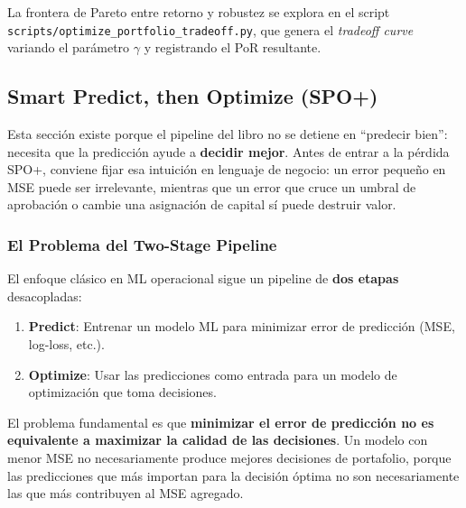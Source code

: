 \documentclass[
  spanish,
  11pt,
  letterpaper,
]{scrbook}
\providecommand{\tightlist}{%
  \setlength{\itemsep}{0pt}\setlength{\parskip}{0pt}}
\theoremstyle{plain}
\theoremstyle{remark}
\begin{document}
La frontera de Pareto entre retorno y robustez se explora en el script
\texttt{scripts/optimize\_portfolio\_tradeoff.py}, que genera el
\emph{tradeoff curve} variando el parámetro \(\gamma\) y registrando el
PoR resultante.

\subsection{Smart Predict, then Optimize (SPO+)}\label{sec-spo-plus}

Esta sección existe porque el pipeline del libro no se detiene en
``predecir bien'': necesita que la predicción ayude a \textbf{decidir
mejor}. Antes de entrar a la pérdida SPO+, conviene fijar esa intuición
en lenguaje de negocio: un error pequeño en MSE puede ser irrelevante,
mientras que un error que cruce un umbral de aprobación o cambie una
asignación de capital sí puede destruir valor.

\subsubsection{El Problema del Two-Stage
Pipeline}\label{el-problema-del-two-stage-pipeline}

El enfoque clásico en ML operacional sigue un pipeline de \textbf{dos
etapas} desacopladas:

\begin{enumerate}
\def\labelenumi{\arabic{enumi}.}
\tightlist
\item
  \textbf{Predict}: Entrenar un modelo ML para minimizar error de
  predicción (MSE, log-loss, etc.).
\item
  \textbf{Optimize}: Usar las predicciones como entrada para un modelo
  de optimización que toma decisiones.
\end{enumerate}

El problema fundamental es que \textbf{minimizar el error de predicción
no es equivalente a maximizar la calidad de las decisiones}. Un modelo
con menor MSE no necesariamente produce mejores decisiones de
portafolio, porque las predicciones que más importan para la decisión
óptima no son necesariamente las que más contribuyen al MSE agregado.
\end{document}
